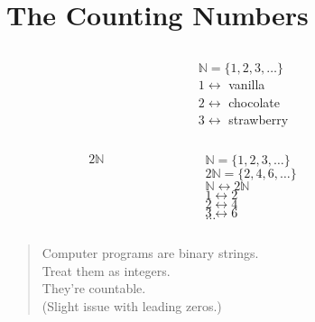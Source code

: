 \documentclass{beamer}
\begin{document}
\section{The Counting Numbers}


\begin{frame}
  \begin{columns}
    \begin{column}{0.3\textwidth}
      \centering
    \end{column}
    {\color{gmitgrey!30}\vrule{}} \hspace{0.1\textwidth}
    \begin{column}{0.5\textwidth}
      $\mathbb{N} = \{1,2,3,\ldots\}$ \\[8mm]
      $1 \leftrightarrow $ vanilla \\[8mm]
      $2 \leftrightarrow $ chocolate \\[8mm]
      $3 \leftrightarrow $ strawberry \\[8mm]
    \end{column}
  \end{columns}
\end{frame}


\begin{frame}
  \begin{columns}
    \begin{column}{0.3\textwidth}
      \color{gmitblue} \fontsize{30}{10}
      \[2\mathbb{N}\]
    \end{column}
    {\color{gmitgrey!30}\vrule{}} \hspace{0.1\textwidth}
    \begin{column}{0.5\textwidth}
      $\mathbb{N} = \{1,2,3,\ldots\}$ \\[4mm]
      $2\mathbb{N} = \{2,4,6,\ldots\}$ \\[4mm]
      $\mathbb{N} \leftrightarrow 2 \mathbb{N}$ \\[8mm]
      $1 \leftrightarrow 2$ \\[4mm]
      $2 \leftrightarrow 4$ \\[4mm]
      $3 \leftrightarrow 6$ \\[4mm]
      $\ldots$ \\[4mm]
    \end{column}
  \end{columns}
\end{frame}


\begin{frame}[standout]
  \begin{quote}
    Computer programs are binary strings. \\[8mm]
    Treat them as integers. \\[8mm]
    They're countable. \\[8mm]
    (Slight issue with leading zeros.)
  \end{quote}
\end{frame}
\end{document}
